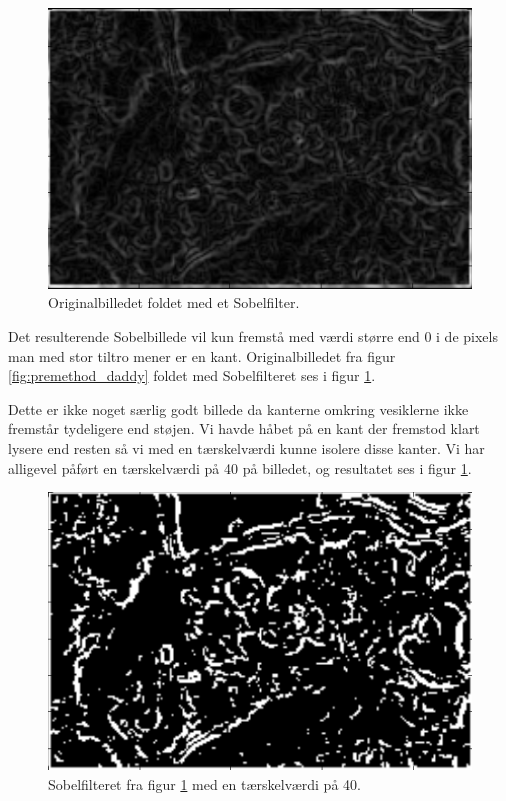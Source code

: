 \begin{figure}[H]
	\centering
	\includegraphics[scale=0.8]{files/premethod/img/sobel3.png}
	\caption{Originalbilledet foldet med et Sobelfilter.\label{fig:premethod_sobel}}
\end{figure}

Det resulterende Sobelbillede vil kun fremstå med værdi større end 0 i de pixels man med stor tiltro mener er en kant. Originalbilledet fra figur \ref{fig:premethod_daddy} foldet med Sobelfilteret ses i figur \ref{fig:premethod_sobel}. 

Dette er ikke noget særlig godt billede da kanterne omkring vesiklerne ikke fremstår tydeligere end støjen. Vi havde håbet på en kant der fremstod klart lysere end resten så vi med en tærskelværdi kunne isolere disse kanter. Vi har alligevel påført en tærskelværdi på 40 på billedet, og resultatet ses i figur \ref{fig:premethod_sobel}.

\begin{figure}[H]
	\centering
	\includegraphics[scale=0.8]{files/premethod/img/edgemap2.png}
	\caption{Sobelfilteret fra figur \ref{fig:premethod_sobel} med en tærskelværdi på 40.\label{fig:premethod_edgemap}}
\end{figure}

